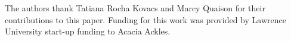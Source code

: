 The authors thank Tatiana Rocha Kovacs and Marcy Quaison for their contributions to this paper. Funding for this work was provided by Lawrence University start-up funding to Acacia Ackles.
